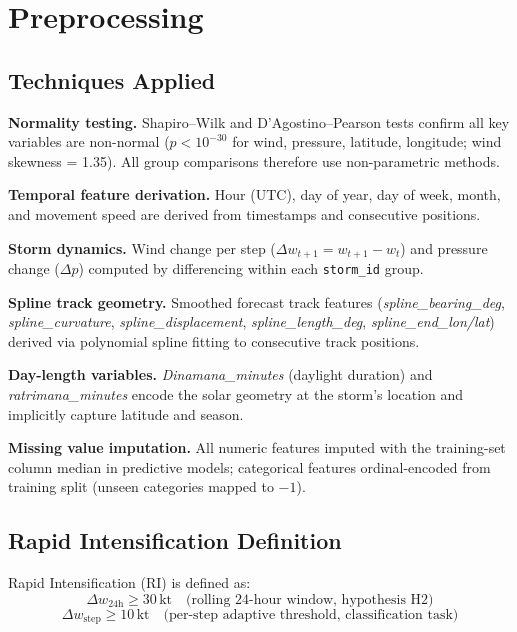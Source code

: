 \documentclass[12pt,a4paper]{article}
\begin{document}
    \section{Preprocessing}
    \label{sec:preprocessing}

    \subsection{Techniques Applied}

    \textbf{Normality testing.} Shapiro--Wilk and D'Agostino--Pearson tests
    confirm all key variables are non-normal ($p < 10^{-30}$ for wind, pressure,
    latitude, longitude; wind skewness = 1.35). All group comparisons therefore
    use non-parametric methods.

    \textbf{Temporal feature derivation.} Hour (UTC), day of year, day of week,
    month, and movement speed are derived from timestamps and consecutive positions.

    \textbf{Storm dynamics.} Wind change per step ($\Delta w_{t+1} = w_{t+1} - w_t$)
    and pressure change ($\Delta p$) computed by differencing within each
    \texttt{storm\_id} group.

    \textbf{Spline track geometry.} Smoothed forecast track features
    (\textit{spline\_bearing\_deg}, \textit{spline\_curvature}, \textit{spline\_displacement},
    \textit{spline\_length\_deg}, \textit{spline\_end\_lon/lat}) derived via
    polynomial spline fitting to consecutive track positions.

    \textbf{Day-length variables.} \textit{Dinamana\_minutes} (daylight duration)
    and \textit{ratrimana\_minutes} encode the solar geometry at the storm's
    location and implicitly capture latitude and season.

    \textbf{Missing value imputation.} All numeric features imputed with the
    training-set column median in predictive models; categorical features
    ordinal-encoded from training split (unseen categories mapped to $-1$).

    \subsection{Rapid Intensification Definition}

    Rapid Intensification (RI) is defined as:
    \begin{equation}
    \Delta w_{\text{24h}} \geq 30\,\text{kt} \quad \text{(rolling 24-hour window, hypothesis H2)}
    \end{equation}
    \begin{equation}
    \Delta w_{\text{step}} \geq 10\,\text{kt} \quad \text{(per-step adaptive threshold, classification task)}
    \end{equation}
\end{document}
